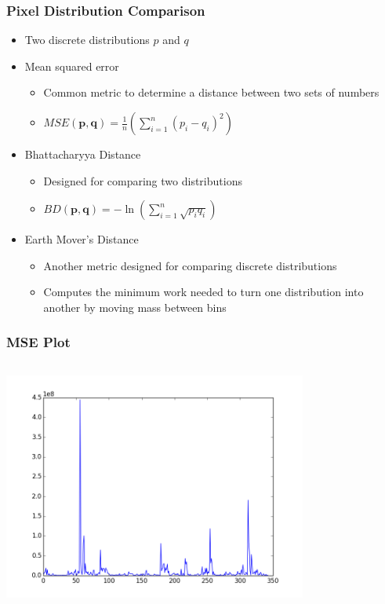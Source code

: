 \documentclass{beamer}
\begin{document}
\begin{frame}
\frametitle{Pixel Distribution Comparison}
\begin{itemize}
  \item Two discrete distributions $p$ and $q$
  \item Mean squared error
  \begin{itemize}
    \item Common metric to determine a distance between two sets of numbers
    \item $MSE(\mathbf{p}, \mathbf{q}) = \frac{1}{n} \left( \sum_{i=1}^n{(p_i-q_i)^2} \right)$
  \end{itemize}
  \item Bhattacharyya Distance
  \begin{itemize}
    \item Designed for comparing two distributions
    \item $BD(\mathbf{p}, \mathbf{q}) = - \ln \left( \sum_{i=1}^n {\sqrt{p_iq_i}} \right)$
  \end{itemize}
  \item Earth Mover's Distance
  \begin{itemize}
    \item Another metric designed for comparing discrete distributions
    \item Computes the minimum work needed to turn one distribution into another by moving mass between bins
  \end{itemize}
\end{itemize}
\end{frame}


\begin{frame}
\frametitle{MSE Plot}
\begin{columns}
\begin{centering}
\includegraphics[width = 10cm]{Figures/608MSEplot}
\end{centering}
\end{columns}
\end{frame}
\end{document}
